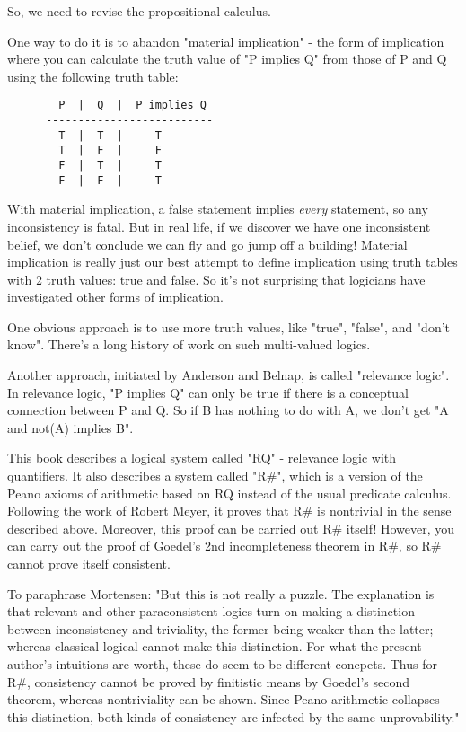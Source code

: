 So, we need to revise the propositional calculus.  

One way to do it is to abandon "material implication" - the form of
implication where you can calculate the truth value of "P implies Q"
from those of P and Q using the following truth table:
\begin{verbatim}
        P  |  Q  |  P implies Q
      --------------------------
        T  |  T  |     T
        T  |  F  |     F
        F  |  T  |     T
        F  |  F  |     T
\end{verbatim}
    
With material implication, a false statement implies \emph{every} statement, 
so any inconsistency is fatal.  But in real life, if we discover we have
one inconsistent belief, we don't conclude we can fly and go jump off a
building!  Material implication is really just our best attempt to define
implication using truth tables with 2 truth values: true and false.  So
it's not surprising that logicians have investigated other forms of
implication.  

One obvious approach is to use more truth values, like "true",
"false", and "don't know".  There's a long history
of work on such multi-valued logics.

Another approach, initiated by Anderson and Belnap, is called
"relevance logic".  In relevance logic, "P implies
Q" can only be true if there is a conceptual connection between P
and Q.  So if B has nothing to do with A, we don't get "A and
not(A) implies B".

This book describes a logical system called "RQ" - relevance
logic with quantifiers.  It also describes a system called
"R#", which is a version of the Peano axioms of arithmetic
based on RQ instead of the usual predicate calculus.  Following the work
of Robert Meyer, it proves that R# is nontrivial in the sense described
above.  Moreover, this proof can be carried out R# itself!  However, you
can carry out the proof of Goedel's 2nd incompleteness theorem in R#, so
R# cannot prove itself consistent.

To paraphrase Mortensen: "But this is not really a puzzle.  The
explanation is that relevant and other paraconsistent logics turn on
making a distinction between inconsistency and triviality, the former
being weaker than the latter; whereas classical logical cannot make this
distinction.  For what the present author's intuitions are worth, these
do seem to be different concpets.  Thus for R#, consistency cannot be
proved by finitistic means by Goedel's second theorem, whereas
nontriviality can be shown.  Since Peano arithmetic collapses this
distinction, both  kinds of consistency are infected by the same
unprovability."

